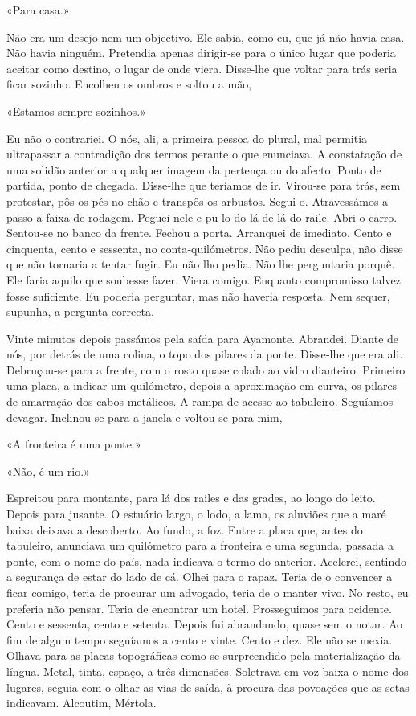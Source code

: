 «Para casa.»

Não era um desejo nem um objectivo. Ele sabia, como eu, que já não havia
casa. Não havia ninguém. Pretendia apenas dirigir­‑se para o único lugar
que poderia aceitar como destino, o lugar de onde viera. Disse­‑lhe que
voltar para trás seria ficar sozinho. Encolheu os ombros e soltou a mão,

«Estamos sempre sozinhos.»

Eu não o contrariei. O nós, ali, a primeira pessoa do plural, mal
permitia ultrapassar a contradição dos termos perante o que enunciava. A
constatação de uma solidão anterior a qualquer imagem da pertença ou do
afecto. Ponto de partida, ponto de chegada. Disse­‑lhe que teríamos de
ir. Virou­‑se para trás, sem protestar, pôs os pés no chão e transpôs os
arbustos. Segui­‑o. Atravessámos a passo a faixa de rodagem. Peguei nele
e pu­‑lo do lá de lá do raile. Abri o carro. Sentou­‑se no banco da
frente. Fechou a porta. Arranquei de imediato. Cento e cinquenta, cento
e sessenta, no conta­‑quilómetros. Não pediu desculpa, não disse que não
tornaria a tentar fugir. Eu não lho pedia. Não lhe perguntaria porquê.
Ele faria aquilo que soubesse fazer. Viera comigo. Enquanto compromisso
talvez fosse suficiente. Eu poderia perguntar, mas não haveria resposta.
Nem sequer, supunha, a pergunta correcta.

Vinte minutos depois passámos pela saída para Ayamonte. Abrandei. Diante
de nós, por detrás de uma colina, o topo dos pilares da ponte.
Disse­‑lhe que era ali. Debruçou­‑se para a frente, com o rosto quase
colado ao vidro dianteiro. Primeiro uma placa, a indicar um quilómetro,
depois a aproximação em curva, os pilares de amarração dos cabos
metálicos. A rampa de acesso ao tabuleiro. Seguíamos devagar.
Inclinou­‑se para a janela e voltou­‑se para mim,

«A fronteira é uma ponte.»

«Não, é um rio.»

Espreitou para montante, para lá dos railes e das grades, ao longo do
leito. Depois para jusante. O estuário largo, o lodo, a lama, os
aluviões que a maré baixa deixava a descoberto. Ao fundo, a foz. Entre a
placa que, antes do tabuleiro, anunciava um quilómetro para a fronteira
e uma segunda, passada a ponte, com o nome do país, nada indicava o
termo do anterior. Acelerei, sentindo a segurança de estar do lado de
cá. Olhei para o rapaz. Teria de o convencer a ficar comigo, teria de
procurar um advogado, teria de o manter vivo. No resto, eu preferia não
pensar. Teria de encontrar um hotel. Prosseguimos para ocidente. Cento e
sessenta, cento e setenta. Depois fui abrandando, quase sem o notar. Ao
fim de algum tempo seguíamos a cento e vinte. Cento e dez. Ele não se
mexia. Olhava para as placas topográficas como se surpreendido pela
materialização da língua. Metal, tinta, espaço, a três dimensões.
Soletrava em voz baixa o nome dos lugares, seguia com o olhar as vias de
saída, à procura das povoações que as setas indicavam. Alcoutim,
Mértola.


